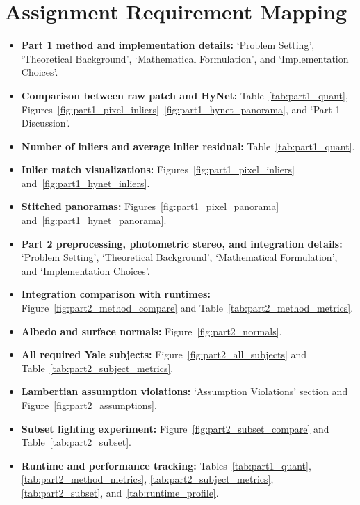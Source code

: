 {\section*{Assignment Requirement Mapping}
\begin{itemize}
\item \textbf{Part 1 method and implementation details:} `Problem Setting',
  `Theoretical Background', `Mathematical Formulation', and `Implementation Choices'.
\item \textbf{Comparison between raw patch and HyNet:} Table~\ref{tab:part1_quant},
  Figures~\ref{fig:part1_pixel_inliers}--\ref{fig:part1_hynet_panorama}, and
  `Part 1 Discussion'.
\item \textbf{Number of inliers and average inlier residual:} Table~\ref{tab:part1_quant}.
\item \textbf{Inlier match visualizations:} Figures~\ref{fig:part1_pixel_inliers}
  and~\ref{fig:part1_hynet_inliers}.
\item \textbf{Stitched panoramas:} Figures~\ref{fig:part1_pixel_panorama}
  and~\ref{fig:part1_hynet_panorama}.
\item \textbf{Part 2 preprocessing, photometric stereo, and integration details:}
  `Problem Setting', `Theoretical Background', `Mathematical Formulation', and
  `Implementation Choices'.
\item \textbf{Integration comparison with runtimes:} Figure~\ref{fig:part2_method_compare}
  and Table~\ref{tab:part2_method_metrics}.
\item \textbf{Albedo and surface normals:} Figure~\ref{fig:part2_normals}.
\item \textbf{All required Yale subjects:} Figure~\ref{fig:part2_all_subjects}
  and Table~\ref{tab:part2_subject_metrics}.
\item \textbf{Lambertian assumption violations:} `Assumption Violations' section
  and Figure~\ref{fig:part2_assumptions}.
\item \textbf{Subset lighting experiment:} Figure~\ref{fig:part2_subset_compare}
  and Table~\ref{tab:part2_subset}.
\item \textbf{Runtime and performance tracking:} Tables~\ref{tab:part1_quant},
  \ref{tab:part2_method_metrics}, \ref{tab:part2_subject_metrics},
  \ref{tab:part2_subset}, and~\ref{tab:runtime_profile}.
\end{itemize}
}